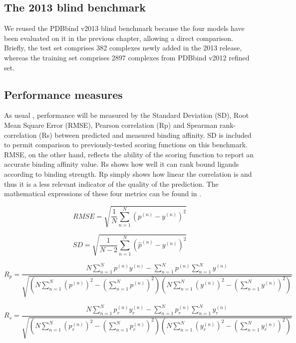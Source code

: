 \documentclass[twocolumn]{bmcart}
\begin{document}
\subsection*{The 2013 blind benchmark}

We reused the PDBbind v2013 blind benchmark because the four models have been evaluated on it in the previous chapter, allowing a direct comparison. Briefly, the test set comprises 382 complexes newly added in the 2013 release, whereas the training set comprises 2897 complexes from PDBbind v2012 refined set.

\subsection*{Performance measures}

As usual \cite{1313}, performance will be measured by the Standard Deviation (SD), Root Mean Square Error (RMSE), Pearson correlation (Rp) and Spearman rank-correlation (Rs) between predicted and measured binding affinity. SD is included to permit comparison to previously-tested scoring functions on this benchmark. RMSE, on the other hand, reflects the ability of the scoring function to report an accurate binding affinity value. Rs shows how well it can rank bound ligands according to binding strength. Rp simply shows how linear the correlation is and thus it is a less relevant indicator of the quality of the prediction. The mathematical expressions of these four metrics can be found in \cite{1432}.

\begin{equation}
RMSE = \sqrt{\frac{1}{N}\sum_{n=1}^N(p^{(n)}-y^{(n)})^2}
\label{eqn:rmse}
\end{equation}

\begin{equation}
SD = \sqrt{\frac{1}{N-2}\sum_{n=1}^N(\hat{p}^{(n)}-y^{(n)})^2}
\label{eqn:sdev}
\end{equation}

\begin{equation}
R_p = \frac{N\sum_{n=1}^Np^{(n)}y^{(n)}-\sum_{n=1}^Np^{(n)}\sum_{n=1}^Ny^{(n)}}{\sqrt{(N\sum_{n=1}^N(p^{(n)})^2-(\sum_{n=1}^Np^{(n)})^2)(N\sum_{n=1}^N(y^{(n)})^2-(\sum_{n=1}^Ny^{(n)})^2)}}
\label{eqn:pcor}
\end{equation}

\begin{equation}
R_s = \frac{N\sum_{n=1}^Np_r^{(n)}y_r^{(n)}-\sum_{n=1}^Np_r^{(n)}\sum_{n=1}^Ny_r^{(n)}}{\sqrt{(N\sum_{n=1}^N(p_r^{(n)})^2-(\sum_{n=1}^Np_r^{(n)})^2)(N\sum_{n=1}^N(y_r^{(n)})^2-(\sum_{n=1}^Ny_r^{(n)})^2)}}
\label{eqn:scor}
\end{equation}
\end{document}
